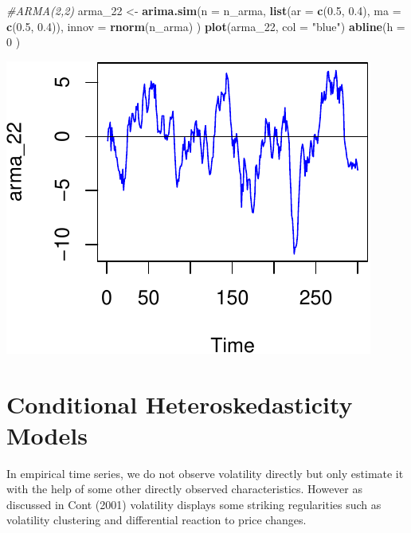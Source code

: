 \documentclass[11pt,]{article}
\newenvironment{Shaded}{\begin{snugshade}}{\end{snugshade}}
\newcommand{\KeywordTok}[1]{\textcolor[rgb]{0.13,0.29,0.53}{\textbf{#1}}}
\newcommand{\DataTypeTok}[1]{\textcolor[rgb]{0.13,0.29,0.53}{#1}}
\newcommand{\DecValTok}[1]{\textcolor[rgb]{0.00,0.00,0.81}{#1}}
\newcommand{\FloatTok}[1]{\textcolor[rgb]{0.00,0.00,0.81}{#1}}
\newcommand{\StringTok}[1]{\textcolor[rgb]{0.31,0.60,0.02}{#1}}
\newcommand{\CommentTok}[1]{\textcolor[rgb]{0.56,0.35,0.01}{\textit{#1}}}
\newcommand{\NormalTok}[1]{#1}
\begin{document}
\begin{Shaded}
\begin{Highlighting}[]
\CommentTok{#ARMA(2,2)}
\NormalTok{arma_}\DecValTok{22}\NormalTok{ <-}\StringTok{ }\KeywordTok{arima.sim}\NormalTok{(}\DataTypeTok{n =}\NormalTok{ n_arma, }
                     \KeywordTok{list}\NormalTok{(}\DataTypeTok{ar =} \KeywordTok{c}\NormalTok{(}\FloatTok{0.5}\NormalTok{, }\FloatTok{0.4}\NormalTok{), }\DataTypeTok{ma =} \KeywordTok{c}\NormalTok{(}\FloatTok{0.5}\NormalTok{, }\FloatTok{0.4}\NormalTok{)), }
                     \DataTypeTok{innov =} \KeywordTok{rnorm}\NormalTok{(n_arma)}
\NormalTok{                     )}
\KeywordTok{plot}\NormalTok{(arma_}\DecValTok{22}\NormalTok{, }\DataTypeTok{col =} \StringTok{"blue"}\NormalTok{)}
\KeywordTok{abline}\NormalTok{(}\DataTypeTok{h =} \DecValTok{0}\NormalTok{ )}
\end{Highlighting}
\end{Shaded}

\begin{center}\includegraphics{FMC_T4_PhD_ARMA_GARCH_files/figure-latex/ARMA_sim-2} \end{center}

\section{Conditional Heteroskedasticity
Models}\label{conditional-heteroskedasticity-models}

In empirical time series, we do not observe volatility directly but only
estimate it with the help of some other directly observed
characteristics. However as discussed in Cont (2001) volatility displays
some striking regularities such as volatility clustering and
differential reaction to price changes.
\end{document}
